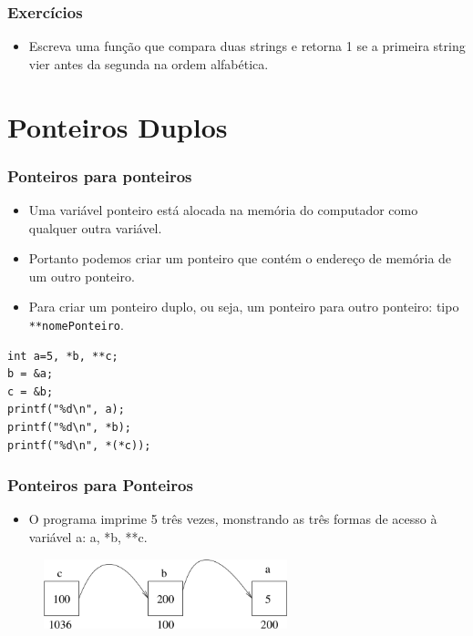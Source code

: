 \documentclass[aspectratio=169]{beamer}
\begin{document}

\begin{frame}
  \frametitle{Exercícios}
\begin{itemize}
\item Escreva uma função que compara duas strings e retorna 1 se a primeira string vier antes da segunda na ordem alfabética.
\end{itemize}
\end{frame}

\section{Ponteiros Duplos}

\begin{frame}[fragile]
\frametitle{Ponteiros para ponteiros}
\begin{itemize}
\item  Uma variável ponteiro está alocada na memória do computador como qualquer outra variável.
\item Portanto podemos criar um ponteiro que contém o endereço de memória de um outro ponteiro.
\item Para criar um ponteiro duplo, ou seja, um ponteiro para outro ponteiro: tipo \verb|**nomePonteiro|.
\end{itemize}
\begin{lstlisting}
int a=5, *b, **c;
b = &a;
c = &b;
printf("%d\n", a);
printf("%d\n", *b);
printf("%d\n", *(*c));
\end{lstlisting}
\end{frame}


\begin{frame}
\frametitle{Ponteiros para Ponteiros}
\begin{itemize}
\item O programa imprime 5 três vezes, monstrando as três formas de acesso à variável a: a, *b, **c.
\end{itemize}
\begin{figure}[!ht]
  \centering
  \includegraphics[width=200pt]{imgs/ponteiro_duplo.png}
\end{figure}
\end{frame}
\end{document}

